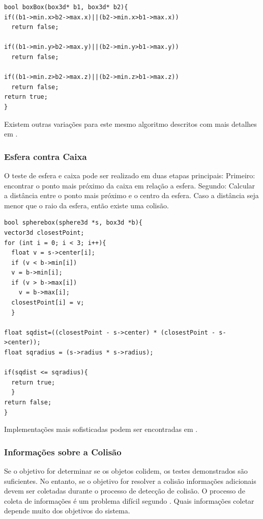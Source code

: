 \begin{lstlisting}[frame=single,caption=Colisão entre caixas\label{code:collisionBoxBox}]
bool boxBox(box3d* b1, box3d* b2){
if((b1->min.x>b2->max.x)||(b2->min.x>b1->max.x))
  return false;

if((b1->min.y>b2->max.y)||(b2->min.y>b1->max.y))
  return false;

if((b1->min.z>b2->max.z)||(b2->min.z>b1->max.z))
  return false;
return true;
}
\end{lstlisting}

Existem outras variações para este mesmo algoritmo descritos com mais detalhes
em .

\subsubsection{Esfera contra Caixa}

O teste de esfera e caixa pode ser realizado em duas etapas principais:
Primeiro: encontrar o ponto mais próximo da caixa em relação a esfera.
Segundo: Calcular a distância entre o ponto mais próximo e o centro da esfera.
Caso a distância seja menor que o raio da esfera, então existe uma colisão.

\begin{lstlisting}[frame=single,caption=Colisão entre esfera e caixa\label{code:collisionSphereBox}]
bool spherebox(sphere3d *s, box3d *b){
vector3d closestPoint;
for (int i = 0; i < 3; i++){
  float v = s->center[i];
  if (v < b->min[i])
  v = b->min[i];  
  if (v > b->max[i])
    v = b->max[i];
  closestPoint[i] = v;
  }
  
float sqdist=((closestPoint - s->center) * (closestPoint - s->center));
float sqradius = (s->radius * s->radius);

if(sqdist <= sqradius){
  return true;
  }
return false;
}
\end{lstlisting}

Implementações mais sofisticadas podem ser encontradas em .

\subsubsection{Informações sobre a Colisão}

Se o objetivo for determinar  se os objetos colidem, os testes demonstrados são
suficientes. No entanto, se o objetivo for resolver a colisão informações adicionais devem
ser coletadas durante o processo de detecção de colisão. O processo de coleta
de informações é um problema difícil segundo .
Quais informações coletar depende muito dos objetivos do sistema.

